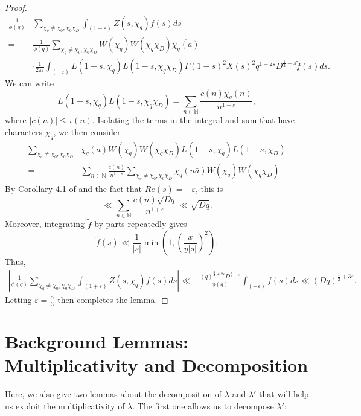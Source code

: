 \documentclass{amsart}
\begin{document}
\begin{proof}
\begin{align*}
\frac{1}{\phi(q)}&\sum_{\chi_q\neq \chi_0,\chi_0\chi_D}\int_{(1+\varepsilon)}Z(s,\chi_q)\tilde{f}(s)ds\\
=&\frac{1}{\phi(q)}\sum_{\chi_q\neq \chi_0,\chi_0\chi_D}W(\chi_q)W(\chi_q\chi_D)\overline{\chi_q(a)}\\
&\cdot \frac{1}{2\pi i}\int_{(-\varepsilon)}L(1-s,\chi_q)L(1-s,\chi_q\chi_D)\Gamma(1-s)^2X(s)^2q^{1-2s}D^{\frac 12-s}\tilde{f}(s)ds.
\end{align*}
We can write
$$L(1-s,\chi_q)L(1-s,\chi_q\chi_D)=\sum_{n\in \mathbb N}\frac{c(n)\chi_q(n)}{n^{1-s}},$$
where $|c(n)|\leq \tau(n)$.
Isolating the terms in the integral and sum that have characters $\chi_q$, we then consider
\begin{align*}
\sum_{\chi_q\neq \chi_0,\chi_0\chi_D}&\overline{\chi_q(a)}W(\chi_q)W(\chi_q\chi_D)L(1-s,\chi_q)L(1-s,\chi_D)\\
=&\sum_{n\in \mathbb N}\frac{c(n)}{n^{1-s}}\sum_{\chi_q\neq \chi_0,\chi_0\chi_D}\chi_q(n\bar a)W(\chi_q)W(\chi_q\chi_D).
\end{align*}
By Corollary 4.1 of \cite{FI03} and the fact that $Re(s)=-\varepsilon$, this is
$$\ll \sum_{n\in \mathbb N}\frac{c(n)\sqrt{Dq} }{n^{1+\varepsilon}}\ll \sqrt{Dq}.$$
Moreover, integrating $\tilde{f}$ by parts repeatedly gives
$$\tilde{f}(s)\ll \frac{1}{|s|}\min\left(1,\left(\frac{x}{y|s|}\right)^2\right).$$
Thus,
\begin{align*}
\left|\frac{1}{\phi(q)}\sum_{\chi_q\neq \chi_0,\chi_0\chi_D}\int_{(1+\varepsilon)}Z(s,\chi_q)\tilde{f}(s)ds\right|\ll &\frac{(q)^{\frac 32+2\varepsilon}D^{\frac 12+\varepsilon}}{\phi(q)}\int_{(-\varepsilon)}\tilde{f}(s)ds\ll (Dq)^{\frac 12+3\varepsilon}.
\end{align*}
Letting $\varepsilon=\frac{\alpha}{3}$ then completes the lemma.
\end{proof}

\section{Background Lemmas: Multiplicativity and Decomposition}\label{background2}

Here, we also give two lemmas about the decomposition of $\lambda$ and $\lambda'$ that will help us exploit the multiplicativity of $\lambda$.  The first one allows us to decompose $\lambda'$:
\end{document}
